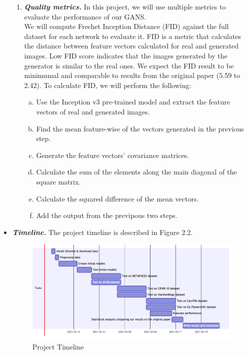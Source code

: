 \documentclass{report}
\begin{document}
\begin{itemize}
\begin{enumerate}
        \item \textbf{\textit{Quality metrics.}} In this project, we will use multiple metrics to evaluate the performance of our GANS.\\We will compute Frechet Inception Distance (FID) against the full dataset for each network to evaluate it. FID is a metric that calculates the distance between feature vectors calculated for real and generated images. Low FID score indicates that the images generated by the generator is similar to the real ones. We expect the FID result to be minimumal and comparable to results from the original paper (5.59 to 2.42). To calculate FID, we will perform the following:
                \begin{enumerate}[(a)]
                \item Use the Inception v3 pre-trained model and extract the feature vectors of real and generated images.
                \item Find the mean feature-wise of the vectors generated in the previous step.
                \item Generate the feature vectors' covariance matrices.
                \item Calculate the sum of the elements along the main diagonal of the square matrix.
                \item Calculate the squared difference of the mean vectors.
                \item Add the output from the previpous two steps.
                \end{enumerate}
        
    \end{enumerate}
    
    \item \textbf{\textit{Timeline.}} The project timeline is described in Figure 2.2.
    
    \begin{figure}[b]
    \centering 
    \includegraphics[width=1\textwidth]{figs/timeline.png}
    \caption{Project Timeline}
\end{figure}

\end{itemize}
\end{document}
